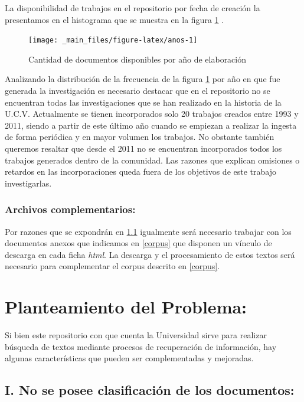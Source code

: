 \documentclass[
  10,
  openany]{book}
\begin{document}
La disponibilidad de trabajos en el repositorio por fecha de creación la presentamos en el histograma que se muestra en la figura \ref{fig:anos} .

\begin{figure}

{\centering \texttt{[image: \_main\_files/figure-latex/anos-1]} 

}

\caption{Cantidad de documentos disponibles por año de elaboración}\label{fig:anos}
\end{figure}

Analizando la distribución de la frecuencia de la figura \ref{fig:anos} por año en que fue generada la investigación es necesario destacar que en el repositorio no se encuentran todas las investigaciones que se han realizado en la historia de la U.C.V. Actualmente se tienen incorporados solo 20 trabajos creados entre 1993 y 2011, siendo a partir de este último año cuando se empiezan a realizar la ingesta de forma periódica y en mayor volumen los trabajos. No obstante también queremos resaltar que desde el 2011 no se encuentran incorporados todos los trabajos generados dentro de la comunidad. Las razones que explican omisiones o retardos en las incorporaciones queda fuera de los objetivos de este trabajo investigarlas.

\hypertarget{archivos-complementarios}{%
\subsubsection{Archivos complementarios:}\label{archivos-complementarios}}

Por razones que se expondrán en \ref{clasificacion} igualmente será necesario trabajar con los documentos anexos que indicamos en \ref{corpus} que disponen un vínculo de descarga en cada ficha \emph{html}. La descarga y el procesamiento de estos textos será necesario para complementar el corpus descrito en \ref{corpus}.

\hypertarget{problema}{%
\section{Planteamiento del Problema:}\label{problema}}

Si bien este repositorio con que cuenta la Universidad sirve para realizar búsqueda de textos mediante procesos de recuperación de información, hay algunas características que pueden ser complementadas y mejoradas.

\hypertarget{clasificacion}{%
\subsection{I. No se posee clasificación de los documentos:}\label{clasificacion}}
\end{document}
